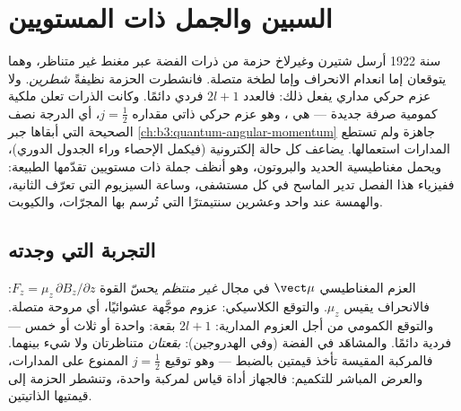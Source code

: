 \chapter{السبين والجمل ذات المستويين}\label{ch:b3:spin-two-level}

سنة 1922 أرسل شتيرن وغيرلاخ حزمة من ذرات الفضة عبر مغنط
غير متناظر، وهما يتوقعان إما انعدام الانحراف وإما لطخة
متصلة. فانشطرت الحزمة نظيفةً \emph{شطرين}. ولا عزم حركي
مداري يفعل ذلك: فالعدد $2l + 1$ فردي دائمًا. وكانت الذرات
تعلن ملكية كمومية صرفة جديدة --- هي \emph{}، وهو عزم
حركي ذاتي مقداره $j = \tfrac12$، أي الدرجة نصف الصحيحة
التي أبقاها جبر \cref{ch:b3:quantum-angular-momentum} جاهزة ولم
تستطع المدارات استعمالها.  يضاعف كل حالة إلكترونية (فيكمل
الإحصاء وراء الجدول الدوري)، ويحمل مغناطيسية الحديد
والبروتون، وهو أنظف جملة ذات مستويين تقدّمها الطبيعة:
ففيزياء هذا الفصل تدير الماسح  في كل مستشفى،
وساعة السيزيوم التي تعرّف الثانية،
والهمسة عند واحد وعشرين سنتيمترًا التي تُرسم بها المجرّات، والكيوبت.

\section{التجربة التي وجدته}

\begin{example}\label{ex:b3:spin-two-level:stern-gerlach}
العزم المغناطيسي $\vect\mu$ في مجال \emph{غير منتظم} يحسّ
القوة $F_z = \mu_z\,\partial B_z/\partial z$: فالانحراف
يقيس $\mu_z$. والتوقع الكلاسيكي: عزوم موجَّهة عشوائيًا،
أي مروحة متصلة. والتوقع الكمومي من أجل العزوم المدارية: $2l + 1$
بقعة: واحدة أو ثلاث أو خمس --- فردية دائمًا. والمشاهَد في الفضة (وفي
الهدروجين): \emph{بقعتان} متناظرتان ولا شيء بينهما. فالمركبة
المقيسة تأخذ قيمتين بالضبط --- وهو توقيع $j
= \tfrac12$ الممنوع على المدارات، والعرض المباشر
للتكميم: فالجهاز أداة قياس لمركبة  واحدة،
وتنشطر الحزمة إلى قيمتيها الذاتيتين.
\end{example}

